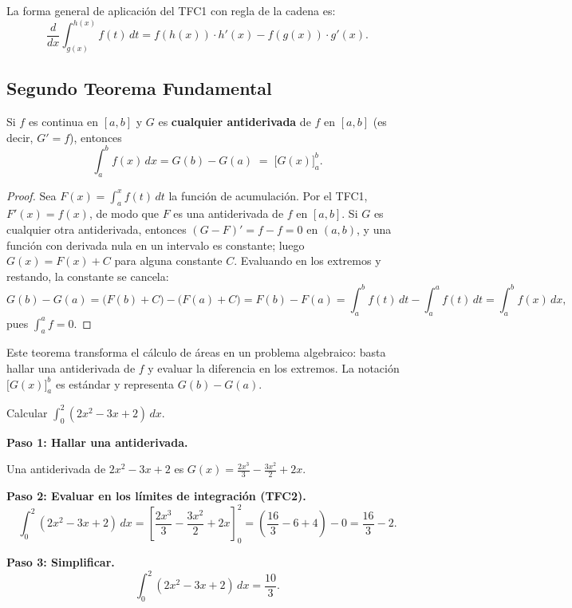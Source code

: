 \begin{rem}
La forma general de aplicación del TFC1 con regla de la cadena es:
\[
\frac{d}{dx}\int_{g(x)}^{h(x)} f(t)\,dt = f(h(x))\cdot h'(x) - f(g(x))\cdot g'(x).
\]
\end{rem}

\subsection{Segundo Teorema Fundamental}

\begin{theorem}
Si $f$ es continua en $[a,b]$ y $G$ es \textbf{cualquier antiderivada} de $f$ en $[a,b]$ (es decir, $G' = f$), entonces
\[
\int_{a}^{b} f(x)\,dx = G(b) - G(a) \;=\; \Big[G(x)\Big]_{a}^{b}.
\]
\end{theorem}

\begin{proof}
Sea $F(x)=\int_a^x f(t)\,dt$ la función de acumulación. Por el TFC1,
$F'(x)=f(x)$, de modo que $F$ es una antiderivada de $f$ en $[a,b]$. Si $G$ es
cualquier otra antiderivada, entonces $(G-F)'=f-f=0$ en $(a,b)$, y una función
con derivada nula en un intervalo es constante; luego $G(x)=F(x)+C$ para alguna
constante $C$. Evaluando en los extremos y restando, la constante se cancela:
\[
  G(b)-G(a)=\bigl(F(b)+C\bigr)-\bigl(F(a)+C\bigr)=F(b)-F(a)
  =\int_a^b f(t)\,dt-\int_a^a f(t)\,dt=\int_a^b f(x)\,dx,
\]
pues $\int_a^a f=0$.
\end{proof}

Este teorema transforma el cálculo de áreas en un problema algebraico: basta hallar una antiderivada de $f$ y evaluar la diferencia en los extremos. La notación $\Big[G(x)\Big]_a^b$ es estándar y representa $G(b) - G(a)$.

\begin{example}
Calcular $\displaystyle\int_{0}^{2}(2x^2 - 3x + 2)\,dx$.

\begin{myproof}

\textbf{Paso 1: Hallar una antiderivada.}

Una antiderivada de $2x^2 - 3x + 2$ es $G(x) = \frac{2x^3}{3} - \frac{3x^2}{2} + 2x$.

\textbf{Paso 2: Evaluar en los límites de integración (TFC2).}
\[
\int_{0}^{2}(2x^2-3x+2)\,dx = \left[\frac{2x^3}{3} - \frac{3x^2}{2} + 2x\right]_0^2
= \left(\frac{16}{3} - 6 + 4\right) - 0 = \frac{16}{3} - 2.
\]

\textbf{Paso 3: Simplificar.}
\[
\boxed{\int_{0}^{2}(2x^2 - 3x + 2)\,dx = \frac{10}{3}.}
\]
\end{myproof}
\end{example}

